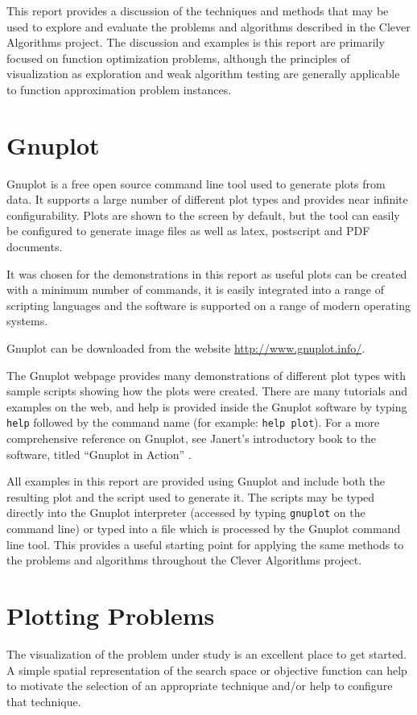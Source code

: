\documentclass[a4paper, 11pt]{article}
\begin{document}
This report provides a discussion of the techniques and methods that may be used to explore and evaluate the problems and algorithms described in the Clever Algorithms project. 
The discussion and examples is this report are primarily focused on function optimization problems, although the principles of visualization as exploration and weak algorithm testing are generally applicable to function approximation problem instances.

%
%
\section{Gnuplot}
Gnuplot is a free open source command line tool used to generate plots from data. It supports a large number of different plot types and provides near infinite configurability. Plots are shown to the screen by default, but the tool can easily be configured to generate image files as well as latex, postscript and PDF documents.

It was chosen for the demonstrations in this report as useful plots can be created with a minimum number of commands, it is easily integrated into a range of scripting languages and the software is supported on a range of modern operating systems. 

Gnuplot can be downloaded from the website \url{http://www.gnuplot.info/}.

The Gnuplot webpage provides many demonstrations of different plot types with sample scripts showing how the plots were created. There are many tutorials and examples on the web, and help is provided inside the Gnuplot software by typing \texttt{help} followed by the command name (for example: \texttt{help plot}). For a more comprehensive reference on Gnuplot, see Janert's introductory book to the software, titled ``Gnuplot in Action'' \cite{Janert2009}.

All examples in this report are provided using Gnuplot and include both the resulting plot and the script used to generate it. The scripts may be typed directly into the Gnuplot interpreter (accessed by typing \texttt{gnuplot} on the command line) or typed into a file which is processed by the Gnuplot command line tool. This provides a useful starting point for applying the same methods to the problems and algorithms throughout the Clever Algorithms project.

%
%
\section{Plotting Problems}
The visualization of the problem under study is an excellent place to get started. A simple spatial representation of the search space or objective function can help to motivate the selection of an appropriate technique and/or help to configure that technique. 
\end{document}
